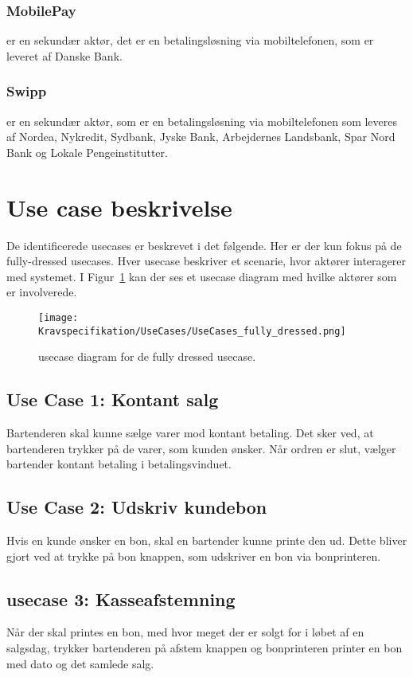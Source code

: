 \subsubsection*{MobilePay} 
er en sekundær aktør, det er en betalingsløsning via mobiltelefonen, som er leveret af Danske Bank.

\subsubsection*{Swipp} 
er en sekundær aktør, som er en betalingsløsning via mobiltelefonen som leveres af Nordea, Nykredit, Sydbank, Jyske Bank, Arbejdernes Landsbank, Spar Nord Bank og Lokale Pengeinstitutter.

\newpage

\section{Use case beskrivelse}
De identificerede \gls{usecase}s er beskrevet i det følgende. Her er der kun fokus på de fully-dressed \gls{usecase}s. Hver \gls{usecase} beskriver et scenarie, hvor aktører interagerer med systemet. I Figur~\ref{fig:fullydressedusecases} kan der ses et \gls{usecase} diagram med hvilke aktører som er involverede.

\begin{figure}[H]
	\centering
	\texttt{[image: Kravspecifikation/UseCases/UseCases\_fully\_dressed.png]}
	\caption{\gls{usecase} diagram for de fully dressed \gls{usecase}.}
	\label{fig:fullydressedusecases}
\end{figure} 

\subsection*{Use Case 1: Kontant salg}
Bartenderen skal kunne sælge varer mod kontant betaling. Det sker ved, at bartenderen trykker på de varer, som kunden ønsker. Når ordren er slut, vælger \gls{bartender} kontant betaling i betalingsvinduet.

\subsection*{Use Case 2: Udskriv kundebon}
Hvis en kunde ønsker en bon, skal en \gls{bartender} kunne printe den ud. Dette bliver gjort ved at trykke på bon knappen, som udskriver en bon via bonprinteren.

\subsection*{\gls{usecase} 3: Kasseafstemning}
Når der skal printes en bon, med hvor meget der er solgt for i løbet af en salgsdag, trykker bartenderen på afstem knappen og bonprinteren printer en bon med dato og det samlede salg. 

